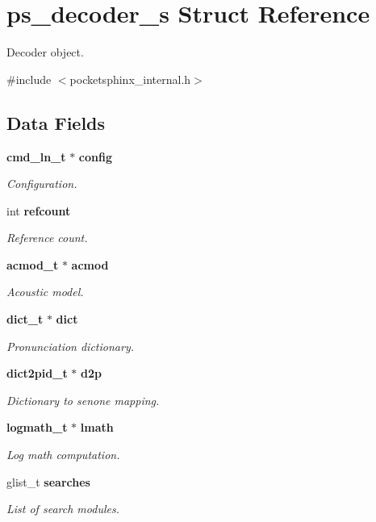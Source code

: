 \section{ps\-\_\-decoder\-\_\-s Struct Reference}
\label{structps__decoder__s}


Decoder object.  




{\ttfamily \#include $<$pocketsphinx\-\_\-internal.\-h$>$}

\subsection*{Data Fields}
\begin{DoxyCompactItemize}
\item 
{\bf cmd\-\_\-ln\-\_\-t} $\ast$ {\bf config}
\begin{DoxyCompactList}\small\item\em Configuration. \end{DoxyCompactList}\item 
int {\bf refcount}
\begin{DoxyCompactList}\small\item\em Reference count. \end{DoxyCompactList}\item 
{\bf acmod\-\_\-t} $\ast$ {\bf acmod}
\begin{DoxyCompactList}\small\item\em Acoustic model. \end{DoxyCompactList}\item 
{\bf dict\-\_\-t} $\ast$ {\bf dict}
\begin{DoxyCompactList}\small\item\em Pronunciation dictionary. \end{DoxyCompactList}\item 
{\bf dict2pid\-\_\-t} $\ast$ {\bf d2p}
\begin{DoxyCompactList}\small\item\em Dictionary to senone mapping. \end{DoxyCompactList}\item 
{\bf logmath\-\_\-t} $\ast$ {\bf lmath}
\begin{DoxyCompactList}\small\item\em Log math computation. \end{DoxyCompactList}\item 
glist\-\_\-t {\bf searches}
\begin{DoxyCompactList}\small\item\em List of search modules. \end{DoxyCompactList}\item 

\end{DoxyCompactItemize}
